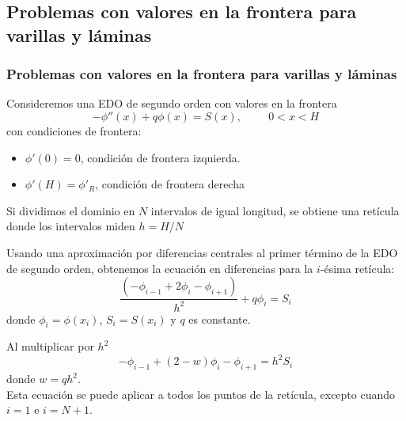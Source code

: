 \subsection{Problemas con valores en la frontera para varillas y l\'{a}minas}
\begin{frame}
\frametitle{Problemas con valores en la frontera para varillas y l\'{a}minas}
Consideremos una EDO de segundo orden con valores en la frontera
\[ - \phi'' (x) + q \phi (x) = S(x), \hspace{1cm} 0< x < H \]
con condiciones de frontera:
\begin{itemize}
\item $\phi'(0) = 0$, condici\'{o}n de frontera izquierda.
\item $\phi'(H) = \phi'_{R}$, condici\'{o}n de frontera derecha
\end{itemize}
\end{frame}
\begin{frame}
Si dividimos el dominio en $N$ intervalos de igual longitud, se obtiene una ret\'{i}cula donde los intervalos miden $h = H/N$
\begin{center}
\end{center}
\end{frame}
\begin{frame}
Usando una aproximaci\'{o}n por diferencias centrales al primer t\'{e}rmino de la EDO de segundo orden, obtenemos la ecuaci\'{o}n en diferencias para
la $i$-\'{e}sima ret\'{i}cula:
\[ \dfrac{(-\phi_{i-1} + 2 \phi_{i} - \phi_{i+1})}{h^{2}} + q \phi_{i} = S_{i} \]
donde $\phi_{i}=\phi(x_{i})$, $S_{i}=S(x_{i})$ y $q$ es constante.
\end{frame}
\begin{frame}
Al multiplicar por $h^{2}$
\[ - \phi_{i-1} + (2-w) \phi_{i} - \phi_{i+1} = h^{2}S_{i} \]
donde $w=qh^{2}$.
\\
\bigskip
Esta ecuaci\'{o}n se puede aplicar a todos los puntos de la ret\'{i}cula, excepto cuando $i = 1$ e $i = N+1$.
\end{frame}
